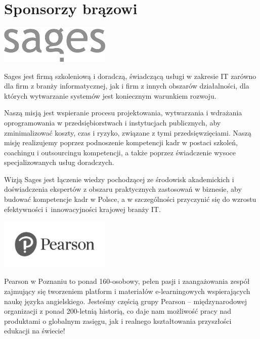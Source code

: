 \documentclass[11pt,twoside,b5paper]{book}
\begin{document}
\newpage
\section*{Sponsorzy brązowi}

\begin{minipage}[t]{0.915\textwidth}
  \begin{center}
    \includegraphics[width=200px]{img/logos.bw/sages.png} 
  \end{center}
\end{minipage}

Sages jest firmą szkoleniową i doradczą, świadczącą usługi w zakresie IT zarówno dla firm z branży informatycznej, jak i firm z innych obszarów działalności, dla których wytwarzanie systemów jest koniecznym warunkiem rozwoju.

Naszą misją jest wspieranie procesu projektowania, wytwarzania i wdrażania oprogramowania w przedsiębiorstwach i instytucjach publicznych, aby zminimalizować koszty, czas i ryzyko, związane z tymi przedsięwzięciami. Naszą misję realizujemy poprzez podnoszenie kompetencji kadr w postaci szkoleń, coachingu i outsourcingu kompetencji, a także poprzez świadczenie wysoce specjalizowanych usług doradczych.

Wizją Sages jest łączenie wiedzy pochodzącej ze środowisk akademickich i doświadczenia ekspertów z obszaru praktycznych zastosowań w biznesie, aby budować kompetencje kadr w Polsce, a w szczególności przyczynić się do wzrostu efektywności i~innowacyjności krajowej branży IT.

\begin{minipage}[t]{0.915\textwidth}
  \begin{center}
    \includegraphics[width=200px]{img/logos.bw/person.png} 
  \end{center}
\end{minipage}

Pearson w Poznaniu to ponad 160-osobowy, pełen pasji i zaangażowania zespół zajmujący się tworzeniem platform i materiałów e-learningowych wspierających naukę języka angielskiego. Jesteśmy częścią grupy Pearson – międzynarodowej organizacji z ponad 200-letnią historią, co daje nam możliwość pracy nad produktami o globalnym zasięgu, jak i realnego kształtowania przyszłości edukacji na świecie!
\end{document}
